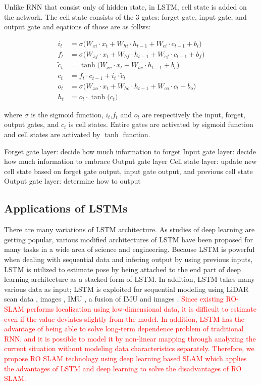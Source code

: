 \documentclass{ieeeaccess}
\begin{document}
Unlike RNN that consist only of hidden state, in LSTM, cell state is added on the network. The cell state consists of the 3 gates: forget gate, input gate, and output gate and eqations of those are as follws:


\begin{align}
i_{t} & =\sigma\big(W_{xi}\cdot x_{t}+W_{hi}\cdot h_{t-1}+W_{ci}\cdot c_{t-1}+b_{i}\big)\\
f_{t} & =\sigma\big(W_{xf}\cdot x_{t}+W_{hf}\cdot h_{t-1}+W_{cf}\cdot c_{t-1}+b_{f}\big)\\
\tilde{c}_{t} & = \tanh\big(W_{xc}\cdot x_{t}+W_{hc}\cdot h_{t-1}+b_{c}\big)\\
c_{t} & =f_{t}\cdot c_{t-1}+i_{t}\cdot\tilde{c}_{t}\\
o_{t} & =\sigma\big(W_{xo}\cdot x_{t}+W_{ho}\cdot h_{t-1}+W_{co}\cdot c_{t}+b_{o}\big)\\
h_{t} & =o_{t}\cdot \tanh\big(c_{t}\big)
\end{align}

where $\sigma$ is the sigmoid function, $i_{t}$,$f_{t}$ and $o_{t}$ are respectively the input, forget, output gates, and $c_{t}$ is cell states. Entire gates are activated by sigmoid function and cell states are activated by $\tanh$ function.


Forget gate layer: decide how much information to forget
Input gate layer: decide how much information to embrace
Output gate layer
Cell state layer: update new cell state based on forget gate output, input gate output, and previous cell state
Output gate layer: determine how to output


\subsection{Applications of LSTMs}

There are many variations of LSTM architecture. As studies of deep learning are getting popular, various modified architectures of LSTM have been proposed for many tasks in a wide area of science and engineering. Because LSTM is powerful when dealing with sequential data and infering output by using previous inputs, LSTM is utilized to estimate pose by being attached to the end part of deep learning architecture \cite{wang2017deepvo, kendall2015posenet, turan2018deep}  as a stacked form of LSTM. In addition, LSTM takes many various data as input; LSTM is exploited for sequential modeling using LiDAR scan data \cite{gladh2016deep}, images \cite{walch2017image, wang2017deepvo}, IMU \cite{ordonez2016deep}, a fusion of IMU and images \cite{clark2017vinet}. \textcolor{red}{Since existing RO-SLAM performs localization using low-dimensional data, it is difficult to estimate even if the value deviates slightly from the model. In addition, LSTM has the advantage of being able to solve long-term dependence problem of traditional RNN, and it is possible to model it by non-linear mapping through analyzing the current situation without modeling data characteristics separately. Therefore, we propose RO SLAM technology using deep learning based SLAM which applies the advantages of LSTM and deep learning to solve the disadvantages of RO SLAM.}
\end{document}
